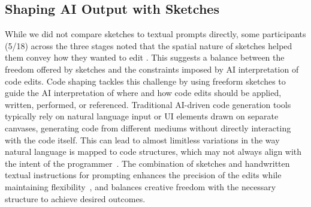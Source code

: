 \subsection{Shaping AI Output with Sketches}
While we did not compare sketches to textual prompts directly, some participants (5/18) across the three stages noted that the spatial nature of sketches helped them convey how they wanted to edit . This suggests a balance between the freedom offered by sketches and the constraints imposed by AI interpretation of code edits. Code shaping tackles this challenge by using freeform sketches to guide the AI interpretation of where and how code edits should be applied, written, performed, or referenced.
Traditional AI-driven code generation tools typically rely on natural language input or UI elements drawn on separate canvases, generating code from different mediums without directly interacting with the code itself. 
This can lead to almost limitless variations in the way natural language is mapped to code structures, which may not always align with the intent of the programmer~\cite{liu_what_2023}.
The combination of sketches and handwritten textual instructions for prompting enhances the precision of the edits while maintaining flexibility~\cite{haught2003creativity}, and balances creative freedom with the necessary structure to achieve desired outcomes.




